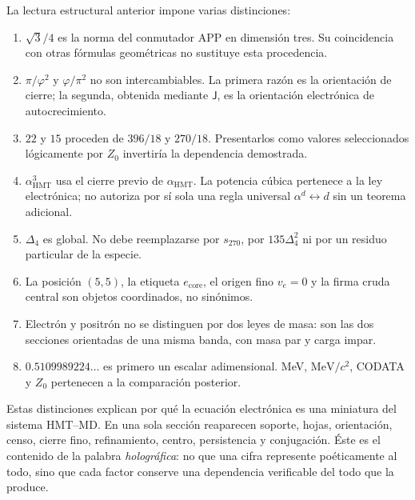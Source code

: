 La lectura estructural anterior impone varias distinciones:

\begin{enumerate}
\item \(\sqrt3/4\) es la norma del conmutador APP en dimensión tres. Su
coincidencia con otras fórmulas geométricas no sustituye esta procedencia.

\item \(\pi/\varphi^2\) y \(\varphi/\pi^2\) no son intercambiables. La
primera razón es la orientación de cierre; la segunda, obtenida mediante
\(\mathsf J\), es la orientación electrónica de autocrecimiento.

\item \(22\) y \(15\) proceden de \(396/18\) y \(270/18\).
Presentarlos como valores seleccionados lógicamente por \(Z_0\) invertiría
la dependencia demostrada.

\item \(\alpha_{\mathrm{HMT}}^3\) usa el cierre previo de
\(\alpha_{\mathrm{HMT}}\). La potencia cúbica pertenece a la ley
electrónica; no autoriza por sí sola una regla universal
\(\alpha^d\leftrightarrow d\) sin un teorema adicional.

\item \(\Delta_4\) es global. No debe reemplazarse por
\(s_{270}\), por \(135\Delta_4^2\) ni por un residuo particular de la
especie.

\item La posición \((5,5)\), la etiqueta \(e_{\mathrm{core}}\), el origen
fino \(v_e=0\) y la firma cruda central son objetos coordinados, no
sinónimos.

\item Electrón y positrón no se distinguen por dos leyes de masa: son las
dos secciones orientadas de una misma banda, con masa par y carga impar.

\item \(0.5109989224\ldots\) es primero un escalar adimensional. MeV,
\(\mathrm{MeV}/c^2\), CODATA y \(Z_0\) pertenecen a la comparación
posterior.
\end{enumerate}

Estas distinciones explican por qué la ecuación electrónica es una
miniatura del sistema HMT--MD. En una sola sección reaparecen soporte,
hojas, orientación, censo, cierre fino, refinamiento, centro, persistencia
y conjugación. Éste es el contenido de la palabra \emph{holográfica}: no
que una cifra represente poéticamente al todo, sino que cada factor
conserve una dependencia verificable del todo que la produce.
